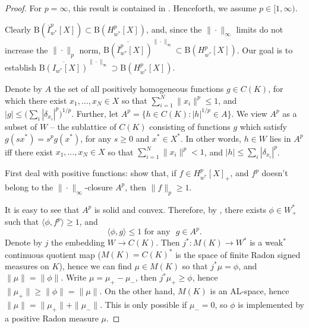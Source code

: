 \documentclass{amsart}
\theoremstyle{plain}
\theoremstyle{definition}
\numberwithin{equation}{section}
\newcommand{\R}{\mathbb{R}}
\newcommand{\ball}{\mathrm{B}}
\newcommand{\Hp}{H_{w^*}^{p}}
\newcommand{\Ip}{\overline{I}_{w^*}^{p}}
\begin{document}
\begin{proof}
For $p = \infty$, this result is contained in \cite{OiTTT}. Henceforth, we assume $p \in [1,\infty)$. %

Clearly $\ball(\Ip[X]) \subset \ball(\Hp[X])$, and, since the $\| \cdot \|_\infty$ limits do not increase the $\| \cdot \|_p$ norm, $\overline{\ball(\Ip[X])}^{\| \cdot \|_\infty} \subset \ball(\Hp[X])$. Our goal is to establish $ \overline{\ball(I_{w^*}[X])}^{\| \cdot \|_\infty} \supset \ball(\Hp[X])$.

Denote by $A$ the set of all positively homogeneous functions $g \in C(K)$, for which there exist $x_1, \ldots, x_N \in X$ so that $\sum_{i=1}^N \|x_i\|^p \leq 1$, and $|g| \leq \big( \sum_i |\delta_{x_i}|^p \big)^{1/p}$. 
Further, let $A^p = \{h \in C(K) : |h|^{1/p} \in A\}$. We view $A^p$ as a subset of $W$ -- the sublattice of $C(K)$ consisting of functions $g$ which satisfy $g(sx^*) = s^p g(x^*)$, for any $s \geq 0$ and $x^* \in X^*$. %
In other words, $h \in W$ lies in $A^p$ iff there exist $x_1, \ldots, x_N \in X$ so that $\sum_{i=1}^N \|x_i\|^p < 1$, and $|h| \leq \sum_i  |\delta_{x_i}|^p$. %

First deal with positive functions: show that, if $f \in \Hp[X]_+$, and $f^p$ doesn't belong to the $\| \cdot \|_\infty$-closure $A^p$, then $\|f\|_p \geq 1$. 

It is easy to see that $A^p$ is solid and convex. Therefore, by \cite{OiTu}, there exists $\phi \in W^*_+$ such that $\langle \phi , f^p \rangle \geq 1$, and %
\begin{equation}
\langle \phi , g \rangle \leq 1 \, \, {\textrm{for  any  }} \, \, g \in A^p .
\label{eq:action on Ap}
\end{equation}
Denote by $j$ the embedding $W \to C(K)$. Then $j^* : M(K) \to W^*$ is a weak$^*$ continuous quotient map ($M(K) = C(K)^*$ is the space of finite Radon signed measures on $K$), hence we can find $\mu \in M(K)$ so that $j^* \mu = \phi$, and $\|\mu\| = \|\phi\|$.
Write $\mu = \mu_+ - \mu_-$, then $j^* \mu_+ \geq \phi$, hence $\|\mu_+\| \geq \|\phi\| = \|\mu\|$. On the other hand, $M(K)$ is an AL-space, hence $\|\mu\| = \|\mu_+\| + \|\mu_-\|$. This is only possible if $\mu_- = 0$, so $\phi$ is implemented by a positive Radon measure $\mu$.


\end{proof}
\end{document}
